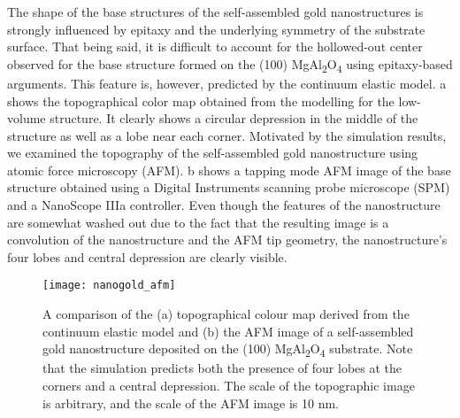 The shape of the base structures of the self-assembled gold
nanostructures is strongly influenced by epitaxy and the underlying symmetry of the substrate surface. That being
said, it is difficult to account for the hollowed-out center
observed for the base structure formed on the (100) MgAl\textsubscript{2}O\textsubscript{4}
using epitaxy-based arguments. This feature is, however,
predicted by the continuum elastic model. a shows
the topographical color map obtained from the modelling for
the low-volume structure. It clearly shows a circular depression in the middle of the structure as well as a lobe near
each corner. Motivated by the simulation results, we
examined the topography of the self-assembled gold nanostructure using atomic force microscopy (AFM). b
shows a tapping mode AFM image of the base structure
obtained using a Digital Instruments scanning probe microscope (SPM) and a NanoScope IIIa controller. Even though
the features of the nanostructure are somewhat washed out
due to the fact that the resulting image is a convolution of
the nanostructure and the AFM tip geometry, the nanostructure's four lobes and central depression are clearly visible.
\begin{figure}
    \centering
    \texttt{[image: nanogold\_afm]}
    \caption[Comparison of AFM and simulated gold nanostructure topography]{\label{fig:nanogold_afm}A comparison of the (a) topographical colour map derived
        from the continuum elastic model and (b) the AFM image of a
        self-assembled gold nanostructure deposited on the (100) MgAl\textsubscript{2}O\textsubscript{4}
        substrate. Note that the simulation predicts both the presence of
        four lobes at the corners and a central depression. The scale of the
        topographic image is arbitrary, and the scale of the AFM image is
        10 nm.}
\end{figure}

